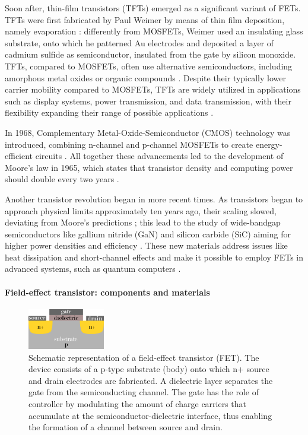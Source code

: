 Soon after, thin-film transistors (TFTs) emerged as a significant variant of FETs. TFTs were first fabricated by Paul Weimer by means of thin film deposition, namely evaporation \citep{weimerTFT1962}: differently from MOSFETs, Weimer used an insulating glass substrate, onto which he patterned Au electrodes and deposited a layer of cadmium sulfide as semiconductor, insulated from the gate by silicon monoxide. TFTs, compared to MOSFETs, often use alternative semiconductors, including amorphous metal oxides or organic compounds \citep{pettiMetal2016}. Despite their typically lower carrier mobility compared to MOSFETs, TFTs are widely utilized in applications such as display systems, power transmission, and data transmission, with their flexibility expanding their range of possible applications \citep{pettiMetal2016}.

In 1968, Complementary Metal-Oxide-Semiconductor (CMOS) technology was introduced, combining n-channel and p-channel MOSFETs to create energy-efficient circuits \citep{wanlassNanowatt1963}. All together these advancements led to the development of Moore's law in \num{1965}, which states that transistor density and computing power should double every two years \citep{mooreCramming1965}.

Another transistor revolution began in more recent times. As transistors began to approach physical limits approximately ten years ago, their scaling slowed, deviating from Moore's predictions \citep{Intel}; this lead to the study of wide-bandgap semiconductors like gallium nitride (GaN) \citep{arakawaProgress2002, lidowEnhancement2011} and silicon carbide (SiC) aiming for higher power densities and efficiency \citep{bhatnagarComparison1993, chenMOS2010}. These new materials address issues like heat dissipation and short-channel effects and make it possible to employ FETs in advanced systems, such as quantum computers \citep{chhowallaTwodimensional2016, chenPerformance2024, niuSuperconducting2024}.

\paragraph{Field-effect transistor: components and materials}

\begin{figure}[ht]
	\centering
	\includegraphics[width=0.3\textwidth]{figures/chapter1/fet/Fig3_FETstructure.pdf}
	\caption{Schematic representation of a field-effect transistor (FET). The device consists of a p-type substrate (body) onto which n+ source and drain electrodes are fabricated. A dielectric layer separates the gate from the semiconducting channel. The gate has the role of controller by modulating the amount of charge carriers that accumulate at the semiconductor-dielectric interface, thus enabling the formation of a channel between source and drain.}
	\label{fig:FETstructure}
\end{figure}

